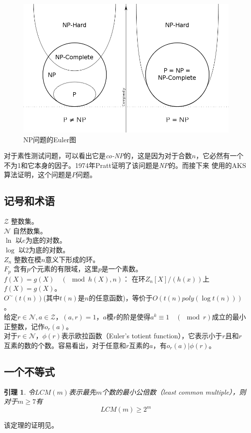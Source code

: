 \documentclass[a4paper,notitlepage]{article}
\newtheorem{lemma}{引理}[section]
\numberwithin{equation}{section}
\begin{document}
\begin{multicols}{2}
  \begin{figure}[htbp]
    \centering
    \includegraphics[width=\columnwidth]{fig/np}
    \caption{NP问题的Euler图}
    \label{fig:np}
  \end{figure}

  \textnormal
  对于素性测试问题，可以看出它是\textit{co-NP}的，这是因为对于合数$n$，它必然有一个不为1和它本身的因子。1974年Pratt证明了该问题是\textit{NP}的\cite{aks}。而接下来
  使用的AKS算法证明，这个问题是$P$问题。
  \subsection{记号和术语}
  \noindent
  $\mathcal{Z}$ 整数集。\\
  $\mathcal{N}$ 自然数集。\\
  $\ln$ 以$e$为底的对数。\\
  $\log$ 以2为底的对数。\\
  $\mathit{Z}_n$ 整数在模$n$意义下形成的环。\\
  $F_p$ 含有$p$个元素的有限域，这里$p$是一个素数。\\
  $f(X)=g(X)\quad(\!\!\!\!\!\mod{h(X)},n)$：
  在环$\mathit{Z}_n\left[X\right]/(h(x))$上$f(X)=g(X)$。\\
  $O^{\sim}(t(n))$(其中$t(n)$是$n$的任意函数)，等价于$O (t(n)poly(\log t(n)))$。\\
  给定$r\in \mathcal{N},a\in \mathcal{Z}$，$(a,r)=1$，$a$模$r$的阶是使得$a^k\equiv
  1\quad(\!\!\!\!\!\mod{r})$成立的最小正整数，记作$o_r (a)$。\\
  对于$r\in \mathcal{N}$，$\phi(r)$表示欧拉函数（Euler’s totient
  function），它表示小于$r$且和$r$互素的数的个数。容易看出，对于任意和$r$互素的$a$，有$o_r (a)|\phi(r)$。
  \subsection{一个不等式}
  \begin{lemma}\label{lcm}
    \upshape 令$LCM(m)$表示最先$m$个数的最小公倍数（least common
    multiple），则对于$m\ge 7$有
    \begin{equation}
      LCM(m)\ge 2^m
    \end{equation}
  \end{lemma}
  该定理的证明见\cite{nai82}。


\end{multicols}
\end{document}
